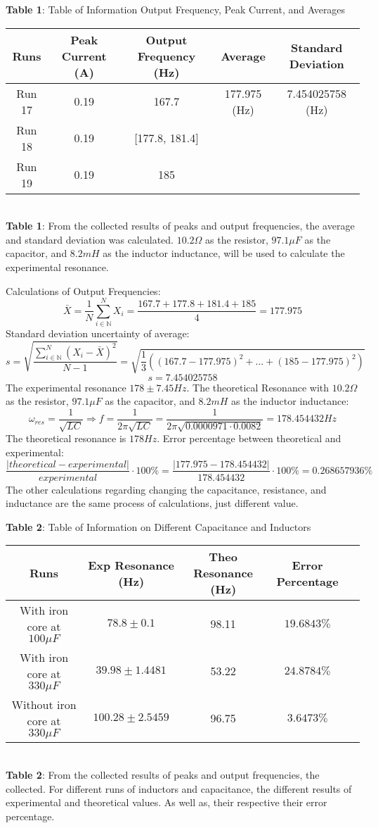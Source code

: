 \documentclass[11pt]{article}
\def\N{{\mathbb{N}}}
\begin{document}
\begin{center}
\caption{\textbf{Table 1}: Table of Information Output Frequency, Peak Current, and Averages} 
 \begin{tabular}{||c c c c c||} 
 \hline
 Runs & Peak Current (A) & Output Frequency (Hz) & Average & Standard Deviation\\ [0.5ex] 
 \hline\hline
 Run 17 & 0.19 & 167.7 & 177.975 (Hz) & 7.454025758 (Hz) \\ 
 \hline
 Run 18 & 0.19 & [177.8, 181.4] & & \\
 \hline
 Run 19 & 0.19 & 185 & & \\ [1ex] 
 \hline
\end{tabular}
\\\textbf{Table 1}: From the collected results of peaks and output frequencies, the average and standard deviation was calculated. $10.2 \Omega$ as the resistor, $97.1 \mu F$ as the capacitor, and $8.2mH$ as the inductor inductance, will be used to calculate the experimental resonance.
\end{center}
Calculations of Output Frequencies:
\[\bar X= \frac{1}{N}\sum^N_{i\in\N}X_i=\frac{167.7+177.8+181.4+185}{4}=177.975\]
Standard deviation uncertainty of average:
\[s=\sqrt{\frac{\sum^N_{i\in\N}(X_i-\bar X)^2}{N-1}}=\sqrt{\frac{1}{3}((167.7-177.975)^2+...+(185-177.975)^2)}\]\[s=7.454025758\]
The experimental resonance $178\pm7.45 Hz$.
The theoretical Resonance with $10.2 \Omega$ as the resistor, $97.1 \mu F$ as the capacitor, and $8.2mH$ as the inductor inductance:
\[\omega_{res}=\frac{1}{\sqrt{LC}} \Rightarrow f=\frac{1}{2\pi \sqrt{LC}}=\frac{1}{2\pi \sqrt{0.0000971\cdot 0.0082}}=178.454432 Hz\]
The theoretical resonance is $178 Hz$.
Error percentage between theoretical and experimental:
\[\frac{|theoretical-experimental|}{experimental}\cdot 100\% =\frac{|177.975-178.454432|}{178.454432}\cdot 100\%=0.268657936\%\]
The other calculations regarding changing the capacitance, resistance, and inductance are the same process of calculations, just different value.
\newpage
\begin{center}
\caption{\textbf{Table 2}: Table of Information on Different Capacitance and Inductors} 
 \begin{tabular}{||c c c c c||} 
 \hline
 Runs & Exp Resonance (Hz) & Theo Resonance (Hz) & Error Percentage &\\ [0.5ex] 
 \hline\hline
 With iron core at $100 \mu F$ & $78.8\pm0.1$ & 98.11 & $19.6843\%$ & \\ 
 \hline
 With iron core at $330 \mu F$ & $39.98\pm1.4481$ & 53.22 & $24.8784\%$ & \\
 \hline
 Without iron core at $330 \mu F$ & $100.28\pm2.5459$ & 96.75 & $3.6473\%$ & \\ [1ex] 
 \hline
\end{tabular}
\\\textbf{Table 2}: From the collected results of peaks and output frequencies, the collected. For different runs of inductors and capacitance, the different results of experimental and theoretical values. As well as, their respective their error percentage.
\end{center}
\end{document}

